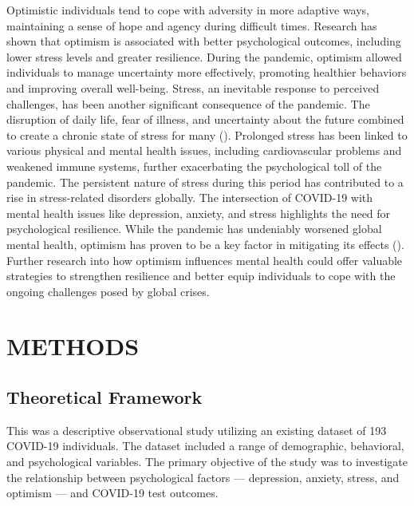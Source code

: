 \documentclass[a4paper]{article}
\begin{document}
Optimistic individuals tend to cope with adversity in more adaptive ways, maintaining a sense of hope and agency during difficult times.
Research has shown that optimism is associated with better psychological outcomes, including lower stress levels and greater resilience. During the pandemic,
optimism allowed individuals to manage uncertainty more effectively, promoting healthier behaviors and improving overall well-being.
\vspace{0.5em}\newline
Stress, an inevitable response to perceived challenges, has been another significant consequence of the pandemic.
The disruption of daily life, fear of illness, and uncertainty about the future combined to create a chronic state of stress for many (\citet{Cohen2016PsychologicalStressDisease}).
Prolonged stress has been linked to various physical and mental health issues,
including cardiovascular problems and weakened immune systems, further exacerbating the psychological toll of the pandemic.
The persistent nature of stress during this period has contributed to a rise in stress-related disorders globally.
\vspace{0.5em}\newline
The intersection of COVID-19 with mental health issues like depression, anxiety, and stress highlights the need for psychological resilience.
While the pandemic has undeniably worsened global mental health, optimism has proven to be a key factor in mitigating its effects (\citet{Conversano2020MindfulnessResilience}). Further research into 
how optimism influences mental health could offer valuable strategies to strengthen resilience and better equip individuals to cope with the ongoing challenges posed by global crises.


\vspace{2em}
\section{METHODS}
\subsection{Theoretical Framework}
\vspace{0.5em}
This was a descriptive observational study utilizing an existing dataset of 193 COVID-19 individuals.
The dataset included a range of demographic, behavioral, and psychological variables.
The primary objective of the study was to investigate the relationship between psychological factors — depression, anxiety, stress, and optimism — and COVID-19 test outcomes.
\end{document}

